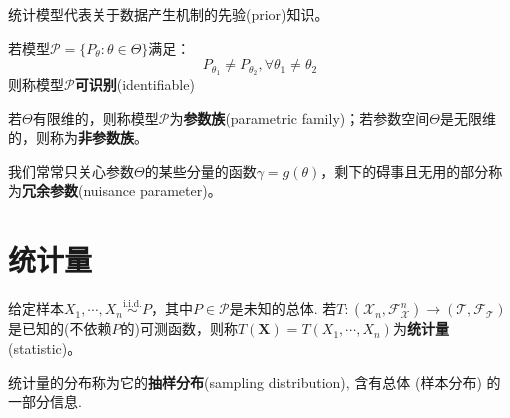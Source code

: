 统计模型代表关于数据产生机制的先验(prior)知识。

\begin{definition}[可识别]
      若模型$\mathcal{P}=\{ P_{\theta}:\theta \in \Theta \}$满足：
      \[ P_{\theta_1} \neq P_{\theta_2}, \forall \theta_1 \neq \theta_2 \]
      则称模型$\mathcal{P}$\textbf{可识别}(identifiable)
\end{definition}

\begin{definition}
      若$\Theta$有限维的，则称模型$\mathcal{P}$为\textbf{参数族}(parametric family)；若参数空间$\Theta$是无限维的，则称为\textbf{非参数族}。
\end{definition}

我们常常只关心参数$\Theta$的某些分量的函数$\gamma=g(\theta)$，剩下的碍事且无用的部分称为\textbf{冗余参数}(nuisance parameter)。

\section{统计量}

\begin{definition}[统计量]
      给定样本$X_1,\cdots ,X_n \overset{\text{i.i.d.}}{\sim} P$，其中$P \in \mathcal{P}$是未知的总体. 若$ T:(\mathcal{X}_n,\mathscr{F}^n_\mathcal{X})\to (\mathcal{T} ,\mathscr{F}_\mathcal{T})$是已知的(不依赖$P$的)可测函数，则称$T(\mathbf{X})=T(X_1,\cdots ,X_n)$为\textbf{统计量}(statistic)。
\end{definition}

\begin{definition}
      统计量的分布称为它的\textbf{抽样分布}(sampling distribution), 含有总体 (样本分布) 的一部分信息.
\end{definition}

